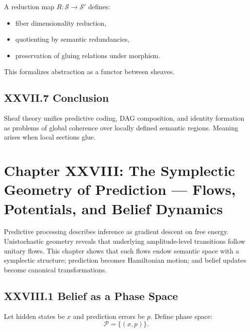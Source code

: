 \documentclass[12pt,letterpaper]{article}
\begin{document}
A reduction map $R : \mathcal{S}\to\mathcal{S}'$ defines:

\begin{itemize}
    \item fiber dimensionality reduction,
    \item quotienting by semantic redundancies,
    \item preservation of gluing relations under morphism.
\end{itemize}

This formalizes abstraction as a functor between sheaves.

\subsection{XXVII.7 Conclusion}

Sheaf theory unifies predictive coding, DAG composition, and identity formation as problems of global coherence over locally defined semantic regions. Meaning arises when local sections glue.

\newpage

\section{Chapter XXVIII: The Symplectic Geometry of Prediction —  
Flows, Potentials, and Belief Dynamics}

Predictive processing describes inference as gradient descent on free energy. Unistochastic geometry reveals that underlying amplitude-level transitions follow unitary flows. This chapter shows that such flows endow semantic space with a symplectic structure; prediction becomes Hamiltonian motion; and belief updates become canonical transformations.

\subsection{XXVIII.1 Belief as a Phase Space}

Let hidden states be $x$ and prediction errors be $p$.  
Define phase space:
\[
\mathcal{P} = \{(x,p)\}.
\]
\end{document}
